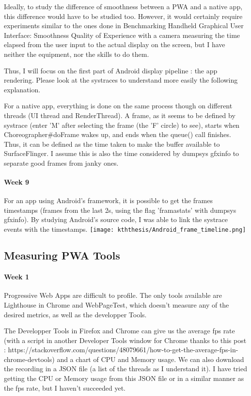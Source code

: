 \documentclass{kththesis}
\begin{document}
Ideally, to study the difference of smoothness between a PWA and a native app, this difference would have to be studied too. However, it would certainly require experiments similar to the ones done in Benchmarking Handheld Graphical User Interface: Smoothness Quality of Experience    with a camera measuring the time elapsed from the user input to the actual display on the screen, but I have neither the equipment, nor the skills to do them. 

Thus, I will focus on the first part of Android display pipeline : the app rendering. Please look at the systraces to understand more easily the following explanation.

For a native app, everything is done on the same process though on different threads (UI thread and RenderThread). A frame, as it seems to be defined by systrace (enter 'M' after selecting the frame (the 'F' circle) to see), starts when Choreographer{\#}doFrame wakes up, and ends when the queue() call finishes. Thus, it can be defined as the time taken to make the buffer available to SurfaceFlinger. I assume this is also the time considered by dumpsys gfxinfo to separate good frames from janky ones.

\paragraph{Week 9}
For an app using Android's framework, it is possible to get the frames timestamps (frames from the last 2s, using the flag 'framastats' with dumpsys gfxinfo). By studying Android's source code, I was able to link the systrace events with the timestamps.
\newline
\texttt{[image: kththesis/Android\_frame\_timeline.png]}
            
\subsection{Measuring PWA Tools}
\paragraph{Week 1}
Progressive Web Apps are difficult to profile. The only tools available are Lighthouse in Chrome and WebPageTest, which doesn't measure any of the desired metrics, as well as the developper Tools.

The Developper Tools in Firefox and Chrome can give us the average fps rate (with a script in another Developer Tools window for Chrome thanks to this post : https://stackoverflow.com/questions/48079661/how-to-get-the-average-fps-in-chrome-devtools) and a chart of CPU and Memory usage. We can also download the recording in a JSON file (a list of the threads as I understand it). I have tried getting the CPU or Memory usage from this JSON file or in a similar manner as the fps rate, but I haven't succeeded yet. 
\end{document}
